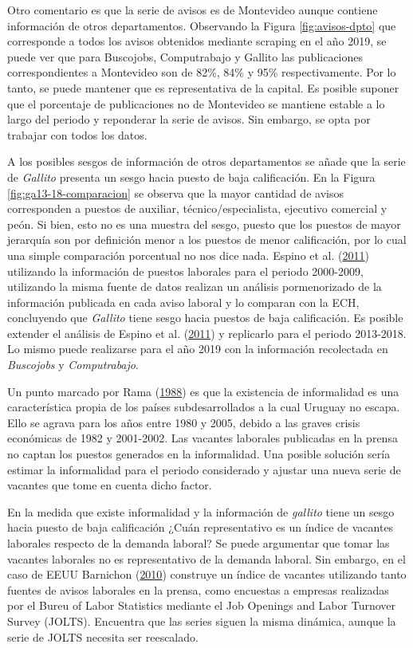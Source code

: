 \documentclass[12pt,oneside]{reedthesis}
\begin{document}
Otro comentario es que la serie de avisos es de Montevideo aunque contiene información de otros departamentos. Observando la Figura \ref{fig:avisos-dpto} que corresponde a todos los avisos obtenidos mediante scraping en el año 2019, se puede ver que para Buscojobs, Computrabajo y Gallito las publicaciones correspondientes a Montevideo son de 82\%, 84\% y 95\% respectivamente. Por lo tanto, se puede mantener que es representativa de la capital. Es posible suponer que el porcentaje de publicaciones no de Montevideo se mantiene estable a lo largo del periodo y reponderar la serie de avisos. Sin embargo, se opta por trabajar con todos los datos.

A los posibles sesgos de información de otros departamentos se añade que la serie de \emph{Gallito} presenta un sesgo hacia puesto de baja calificación. En la Figura \ref{fig:ga13-18-comparacion} se observa que la mayor cantidad de avisos corresponden a puestos de auxiliar, técnico/especialista, ejecutivo comercial y peón. Si bien, esto no es una muestra del sesgo, puesto que los puestos de mayor jerarquía son por definición menor a los puestos de menor calificación, por lo cual una simple comparación porcentual no nos dice nada. Espino et al. (\protect\hyperlink{ref-Alma2011}{2011}) utilizando la información de puestos laborales para el periodo 2000-2009, utilizando la misma fuente de datos realizan un análisis pormenorizado de la información publicada en cada aviso laboral y lo comparan con la ECH, concluyendo que \emph{Gallito} tiene sesgo hacia puestos de baja calificación. Es posible extender el análisis de Espino et al. (\protect\hyperlink{ref-Alma2011}{2011}) y replicarlo para el periodo 2013-2018. Lo mismo puede realizarse para el año 2019 con la información recolectada en \emph{Buscojobs} y \emph{Computrabajo}.

Un punto marcado por Rama (\protect\hyperlink{ref-Rama1988}{1988}) es que la existencia de informalidad es una característica propia de los países subdesarrollados a la cual Uruguay no escapa. Ello se agrava para los años entre 1980 y 2005, debido a las graves crisis económicas de 1982 y 2001-2002. Las vacantes laborales publicadas en la prensa no captan los puestos generados en la informalidad. Una posible solución sería estimar la informalidad para el periodo considerado y ajustar una nueva serie de vacantes que tome en cuenta dicho factor.

En la medida que existe informalidad y la información de \emph{gallito} tiene un sesgo hacia puesto de baja calificación ¿Cuán representativo es un índice de vacantes laborales respecto de la demanda laboral? Se puede argumentar que tomar las vacantes laborales no es representativo de la demanda laboral. Sin embargo, en el caso de EEUU Barnichon (\protect\hyperlink{ref-Barnichon2010}{2010}) construye un índice de vacantes utilizando tanto fuentes de avisos laborales en la prensa, como encuestas a empresas realizadas por el Bureu of Labor Statistics mediante el Job Openings and Labor Turnover Survey (JOLTS). Encuentra que las series siguen la misma dinámica, aunque la serie de JOLTS necesita ser reescalado.
\end{document}
